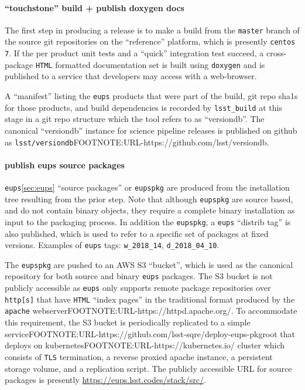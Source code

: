 \paragraph{``touchstone'' build + publish doxygen docs}

The first step in producing a release is to make a build from the
\texttt{master} branch of the source git repositories on the ``reference''
platform, which is presently \texttt{centos 7}.  If the per product unit tests
and a ``quick'' integration test succeed, a cross-package \texttt{HTML}
formatted documentation set is built using \texttt{doxygen} and is published to
a service that developers may access with a web-browser.

A ``manifest'' listing the \texttt{eups} products that were part of the build,
git repo sha1s for those products, and build dependencies is recorded by
\texttt{lsst\_build} at this stage in a git repo structure which the tool
refers to as ``versiondb''.  The canonical ``versiondb'' instance for science
pipeline releases is published on github as
\texttt{lsst/versiondb}FOOTNOTE:URL-https://github.com/lsst/versiondb.

\paragraph{publish eups source packages}
\label{sec:scipipe-deploy}

\texttt{eups}\ref{sec:eups} ``source packages'' or \texttt{eupspkg} are
produced from the installation tree resulting from the prior step.  Note that
although \texttt{eupspkg} are source based, and do not contain binary objects,
they require a complete binary installation as input to the packaging process.
In addition the \texttt{eupspkg}, a \texttt{eups} ``distrib tag'' is also
published, which is used to refer to a specific set of packages at fixed
versions.  Examples of \texttt{eups} tags: \texttt{w\_2018\_14}, \texttt{d\_2018\_04\_10}.

The \texttt{eupspkg} are pushed to an AWS S3 ``bucket'', which is used as the
canonical repository for both source and binary \texttt{eups} packages.  The S3
bucket is not publicly accessible as \texttt{eups} only supports remote
package repositories over \texttt{http[s]} that have \texttt{HTML} ``index
pages'' in the traditional format produced by the \texttt{apache}
webserverFOOTNOTE:URL-https://httpd.apache.org/.  To accommodate this
requirement, the S3 bucket is periodically replicated to a simple
serviceFOOTNOTE:URL-https://github.com/lsst-sqre/deploy-eups-pkgroot that
deploys on kubernetesFOOTNOTE:URL-https://kubernetes.io/ cluster which consists
of \texttt{TLS} termination, a reverse proxied apache instance, a persistent
storage volume, and a replication script.  The publicly accessible URL for
source packages is presently \url{https://eups.lsst.codes/stack/src/}.

